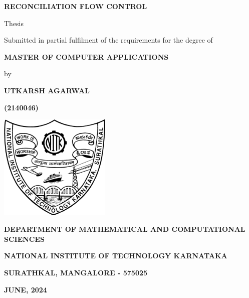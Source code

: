 \documentclass[12pt,a4paper]{report}
\begin{document}
\begin{titlepage}
    \centering
    {\Huge \bfseries{RECONCILIATION FLOW CONTROL}\par}
    \vspace{0.5cm}
    {\large Thesis\\ \par}
    {\large Submitted in partial fulfilment of the requirements for the degree of\par}
  \vspace{0.5cm}
    {\Large\bfseries MASTER OF COMPUTER APPLICATIONS\par}  %
  \vspace{0.5cm}
    {\large by\par}
  \vspace{0.5cm}
    {\Large\bfseries UTKARSH AGARWAL\par}
    \vspace{0.5cm}
    {\Large\bfseries (2140046)\par}
  \vspace{0.5cm}
    \includegraphics[width=0.4\textwidth]{NITK_Emblem.png}\\
    \vspace{1cm}
    {\large\bfseries DEPARTMENT OF MATHEMATICAL AND COMPUTATIONAL SCIENCES \par} 
    \vspace{0.5cm}
    {\large\bfseries NATIONAL INSTITUTE OF TECHNOLOGY KARNATAKA \par} 
    {\large\bfseries SURATHKAL, MANGALORE - 575025\par}
    \vspace{0.5cm}
    {\large\bfseries JUNE, 2024\par}
\end{titlepage}

\end{document}
